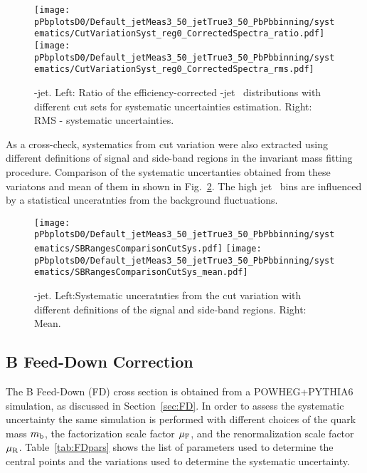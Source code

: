 \begin{figure}[bth]
\begin{center}
\texttt{[image: pPbplotsD0/Default\_jetMeas3\_50\_jetTrue3\_50\_PbPbbinning/systematics/CutVariationSyst\_reg0\_CorrectedSpectra\_ratio.pdf]}
\texttt{[image: pPbplotsD0/Default\_jetMeas3\_50\_jetTrue3\_50\_PbPbbinning/systematics/CutVariationSyst\_reg0\_CorrectedSpectra\_rms.pdf]}
\caption{\Dzero-jet. Left: Ratio of the efficiency-corrected \Dstar-jet \pt\ distributions with different cut sets for systematic uncertainties estimation. Right: RMS - systematic uncertainties.} 
\label{fig:PbPb_JetPtSys_Dzero}
\end{center}
\end{figure}


As a cross-check, systematics from cut variation were also extracted using different definitions of signal and side-band regions in the invariant mass fitting procedure. Comparison of the systematic uncertanties obtained from these variatons and mean of them in shown in Fig.~\ref{fig:PbPb_JetPtSys_Dzero_SB}. The high jet \pt\ bins are influenced by a statistical unceratnties from the background fluctuations. 

\begin{figure}[bth]
\begin{center}
\texttt{[image: pPbplotsD0/Default\_jetMeas3\_50\_jetTrue3\_50\_PbPbbinning/systematics/SBRangesComparisonCutSys.pdf]}
\texttt{[image: pPbplotsD0/Default\_jetMeas3\_50\_jetTrue3\_50\_PbPbbinning/systematics/SBRangesComparisonCutSys\_mean.pdf]}
\caption{\Dzero-jet. Left:Systematic unceratnties from the cut variation with different definitions of the signal and side-band regions. Right: Mean.} 
\label{fig:PbPb_JetPtSys_Dzero_SB}
\end{center}
\end{figure}

\subsection{B Feed-Down Correction}

The B Feed-Down (FD) cross section is obtained from a POWHEG+PYTHIA6 simulation, as discussed in Section~\ref{sec:FD}.
In order to assess the systematic uncertainty the same simulation is performed with different choices of the quark mass $m_{\rm b}$, the factorization scale factor $\mu_{\rm F}$, and the renormalization scale factor $\mu_{\rm R}$.
Table~\ref{tab:FDpars} shows the list of parameters used to determine the central points and the variations used to determine the systematic uncertainty.


